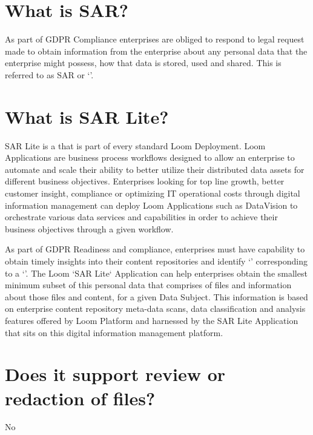 \documentclass[letterpaper,10pt,english]{sphinxmanual}
\begin{document}
\section{What is SAR?}
\label{\detokenize{loom_trbs_faq:what-is-sar}}
As part of GDPR Compliance enterprises are obliged to respond to legal request made to obtain information from the enterprise about any personal data that the enterprise might possess, how that data is stored, used and shared.  This is referred to as SAR or ‘’.


\section{What is SAR Lite?}
\label{\detokenize{loom_trbs_faq:what-is-sar-lite}}
SAR Lite is a  that is part of every standard Loom Deployment. Loom Applications are business process workflows designed to allow an enterprise to automate and scale their ability to better utilize their distributed data assets for different business objectives. Enterprises looking for top line growth, better customer insight, compliance or optimizing IT operational costs through digital information management can deploy Loom Applications such as DataVision to orchestrate various data services and capabilities in order to achieve their business objectives through a given workflow.

As part of GDPR Readiness and compliance, enterprises must have capability to obtain timely insights into their content repositories and identify ‘’ corresponding to a ‘’. The Loom ‘SAR Lite{}` Application can help enterprises obtain the smallest minimum subset of this personal data that comprises of files and information about those files and content, for a given Data Subject. This information is based on enterprise content repository meta-data scans, data classification and analysis features offered by Loom Platform and harnessed by the SAR Lite Application that sits on this digital information management platform.


\section{Does it support review or redaction of files?}
\label{\detokenize{loom_trbs_faq:does-it-support-review-or-redaction-of-files}}
No
\end{document}
